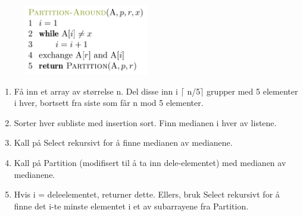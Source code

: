\documentclass[12pt]{report}
\begin{document}
\begin{multicols}{2}
\par


\vspace{\baselineskip}



\begin{figure}[H]
	\begin{Center}
		\includegraphics[width=2.16in,height=1.22in]{./media/image45.png}
	\end{Center}
\end{figure}



\par


\vspace{\baselineskip}

\end{multicols}
\begin{enumerate}
	\item Få inn et array av størrelse n. Del disse inn i $ \lceil $ n/5$ \rceil $  grupper med 5 elementer i hver, bortsett fra siste som får n mod 5 elementer. \par

	\item Sorter hver subliste med insertion sort. Finn medianen i hver av listene.\par

	\item Kall på Select rekursivt for å finne medianen av medianene.\par

	\item Kall på Partition (modifisert til å ta inn dele-elementet) med medianen av medianene. \par

	\item Hvis i = deleelementet, returner dette. Ellers, bruk Select rekursivt for å finne det i-te minste elementet i et av subarrayene fra Partition. 
\end{enumerate}\par
\end{document}
